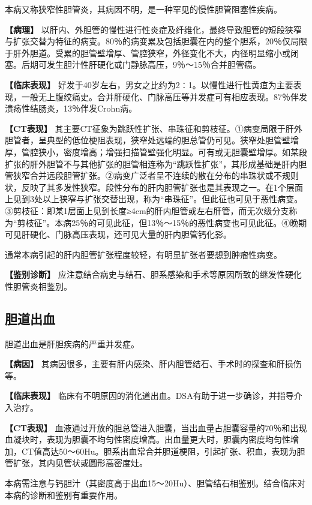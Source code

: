 本病又称狭窄性胆管炎，其病因不明，是一种罕见的慢性胆管阻塞性疾病。

\textbf{【病理】}
以肝内、外胆管的慢性进行性炎症及纤维化，最终导致胆管的短段狭窄与扩张交替为特征的病变。80％的病变累及包括胆囊在内的整个胆系，20％仅局限于肝外胆道。受累的胆管壁增厚、管腔狭窄，外径变化不大，内径明显缩小或闭塞。后期可发生胆汁性肝硬化或门静脉高压，9％～15％合并胆管癌。

\textbf{【临床表现】}
好发于40岁左右，男女之比约为2∶1。以慢性进行性黄疸为主要表现，一般无上腹绞痛史。合并肝硬化、门脉高压等并发症可有相应表现。87％伴发溃疡性结肠炎，13％伴发Crohn病。

\textbf{【CT表现】}
其主要CT征象为跳跃性扩张、串珠征和剪枝征。①病变局限于肝外胆管者，呈典型的低位梗阻表现，狭窄处远端的胆总管仍可见。狭窄处胆管壁增厚，管腔狭小，密度增高；增强扫描管壁强化明显。可有或无胆囊壁增厚。如某段扩张的肝外胆管不与其他扩张的胆管相连称为“跳跃性扩张”，其形成基础是肝内胆管狭窄合并远段胆管扩张。②病变广泛者呈不连续的散在分布的串珠状或不规则状，反映了其多发性狭窄。段性分布的肝内胆管扩张也是其表现之一。在1个层面上见到3处以上狭窄与扩张交替出现，称为“串珠征”。但此征也可见于恶性病变。③剪枝征：即某1层面上见到长度≥4cm的肝内胆管或左右肝管，而无次级分支称为“剪枝征”。本病25％的可见此征，但13％～15％的恶性病变也可见此征。④晚期可见肝硬化、门脉高压表现，还可见大量的肝内胆管钙化影。

通常本病引起的肝内胆管扩张程度较轻，有明显扩张者要想到肿瘤性病变。

\textbf{【鉴别诊断】}
应注意结合病史与结石、胆系感染和手术等原因所致的继发性硬化性胆管炎相鉴别。

\subsection{胆道出血}

胆道出血是肝胆疾病的严重并发症。

\textbf{【病因】}
其病因很多，主要有肝内感染、肝内胆管结石、手术时的探查和肝损伤等。

\textbf{【临床表现】}
临床有不明原因的消化道出血。DSA有助于进一步确诊，并指导介入治疗。

\textbf{【CT表现】}
血液通过开放的胆总管进入胆囊，当出血量占胆囊容量的70％和出现血凝块时，表现为胆囊不均匀性密度增高。出血量更大时，胆囊内密度均匀性增加，CT值高达50～60Hu。胆系出血常合并胆道梗阻，引起扩张、积血，表现为胆管扩张，其内见管状或圆形高密度灶。

本病需注意与钙胆汁（其密度高于出血15～20Hu）、胆管结石相鉴别。结合临床对本病的诊断和鉴别有重要作用。

